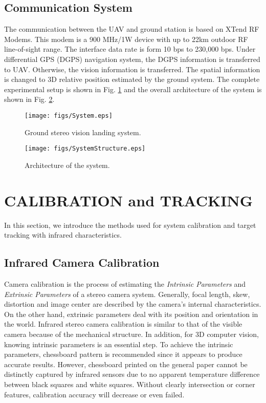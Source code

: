 \documentclass[letterpaper, 10 pt, conference]{ieeeconf}  %
\begin{document}
\subsection{Communication System}
The communication between the UAV and ground station is based on XTend RF Modems. This modem is a 900 MHz/1W device with up to 22km outdoor RF line-of-sight range. The interface data rate is form 10 bps to 230,000 bps. Under differential GPS (DGPS) navigation system, the DGPS information is transferred to UAV. Otherwise, the vision information is transferred. The spatial information is changed to 3D relative position estimated by the ground system. The complete experimental setup is shown in Fig. \ref{fig:system} and the overall architecture of the system is shown in Fig. \ref{fig:SystemStructure}.
   \begin{figure}[!tb]
      \centering
      \texttt{[image: figs/System.eps]}
      \caption{Ground stereo vision landing system.}
      \label{fig:system}
   \end{figure}
   \begin{figure}[!tb]
      \centering
      \texttt{[image: figs/SystemStructure.eps]}
      \caption{Architecture of the system.}
      \label{fig:SystemStructure}
   \end{figure}

\section{CALIBRATION and TRACKING}
In this section, we introduce the methods used for system calibration and target tracking with infrared characteristics.

\subsection{Infrared Camera Calibration}
Camera calibration is the process of estimating the {\it  Intrinsic Parameters} and {\it Extrinsic Parameters} of a stereo camera system. Generally, focal length, skew, distortion and image center are described by the camera's internal characteristics. On the other hand, extrinsic parameters deal with its position and orientation in the world. Infrared stereo camera calibration is similar to that of the visible camera because of the mechanical structure. In addition, for 3D computer vision, knowing intrinsic parameters is an essential step. To achieve the intrinsic parameters, chessboard pattern is recommended since it appears to produce accurate results. However, chessboard printed on the general paper cannot be distinctly captured by infrared sensors due to no apparent temperature difference between black squares and white squares. Without clearly intersection or corner features, calibration accuracy will decrease or even failed.
\end{document}
